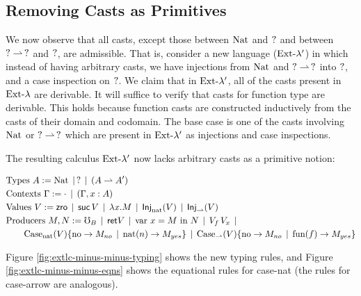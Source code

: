 \subsection{Removing Casts as Primitives}


We now observe that all casts, except those between $\text{Nat}$ and $?$
and between $? \rightharpoonup\, ?$ and $?$, are admissible.
That is, consider a new language ($\text{Ext-}\lambda'$) in which
instead of having arbitrary casts, we have injections from $\text{Nat}$ and
$? \rightharpoonup\, ?$ into $?$, and a case inspection on $?$.
We claim that in $\text{Ext-}\lambda'$, all of the casts present in $\text{Ext-}\lambda$ are derivable.
It will suffice to verify that casts for function type are derivable.
This holds because function casts are constructed inductively from the casts
of their domain and codomain. The base case is one of the casts involving $\text{Nat}$
or $? \rightharpoonup\, ?$ which are present in $\text{Ext-}\lambda'$ as injections and case inspections.


The resulting calculus $\text{Ext-}\lambda'$ now lacks arbitrary casts as a primitive notion:


\begin{align*}
  &\text{Types } A := \text{Nat} \mathrel{\bf \,\mid\,} ? \mathrel{\bf \,\mid\,} (A \rightharpoonup A') \\
  &\text{Contexts } \Gamma := \cdot \mathrel{\bf \,\mid\,} (\Gamma, x : A) \\
  &\text{Values } V :=  \textsf{zro} \mathrel{\bf \,\mid\,} \textsf{suc}\, V \mathrel{\bf \,\mid\,} \lambda {x} . {M} \mathrel{\bf \,\mid\,} \textsf{Inj}_\text{nat} ({V}) \mathrel{\bf \,\mid\,} \textsf{Inj}_\rightharpoonup ({V}) \\ 
  &\text{Producers } M, N := \mho_B \mathrel{\bf \,\mid\,} \mathsf{ret} {V} \mathrel{\bf \,\mid\,} \text{var } {x} = {M} \text{ in } {N}
    \mathrel{\bf \,\mid\,} V_f\, V_x \mathrel{\bf \,\mid\,}
    \\ & \quad\quad \text{Case}_\text{nat} ({V}) \{ \text{no} \to {M_{no}} \mathrel{\bf \,\mid\,} \text{nat}({n}) \to {M_{yes}} \} 
    \mathrel{\bf \,\mid\,} \text{Case}_\rightharpoonup ({V}) \{ \text{no} \to {M_{no}} \mathrel{\bf \,\mid\,} \text{fun}({f}) \to {M_{yes}} \}
\end{align*}


Figure \ref{fig:extlc-minus-minus-typing} shows the new typing rules,
and Figure \ref{fig:extlc-minus-minus-eqns} shows the equational rules
for case-nat (the rules for case-arrow are analogous).

